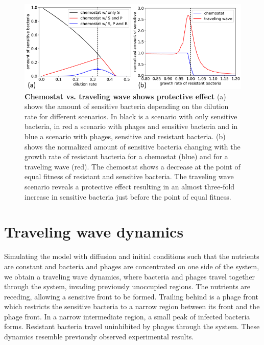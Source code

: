 \begin{figure}
\centering
\includegraphics[width=\linewidth]{graphics/2025_09_26_droplets_fig2.png}
\caption{\textbf{Chemostat vs. traveling wave shows protective effect} (a) shows the amount of sensitive bacteria depending on the dilution rate for different scenarios. In black is a scenario with only sensitive bacteria, in red a scenario with phages and sensitive bacteria and in blue a scenario with phages, sensitive and resistant bacteria. (b) shows the normalized amount of sensitive bacteria changing with the growth rate of resistant bacteria for a chemostat (blue) and for a traveling wave (red). The chemostat shows a decrease at the point of equal fitness of resistant and sensitive bacteria. The traveling wave scenario reveals a protective effect resulting in an almost three-fold increase in sensitive bacteria just before the point of equal fitness.}
\label{fig:results_chemostat_traveling_wave}
\end{figure}

\section{Traveling wave dynamics}
Simulating the model with diffusion and initial conditions such that the nutrients are constant and bacteria and phages are concentrated on one side of the system, we obtain a traveling wave dynamics, where bacteria and phages travel together through the system, invading previously unoccupied regions. The nutrients are receding, allowing a sensitive front to be formed. Trailing behind is a phage front which restricts the sensitive bacteria to a narrow region between its front and the phage front. In a narrow intermediate region, a small peak of infected bacteria forms. Resistant bacteria travel uninhibited by phages through the system. These dynamics resemble previously observed experimental results. 

